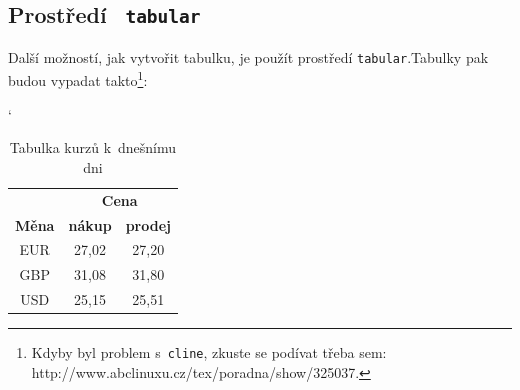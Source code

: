 \documentclass[11pt,a4paper]{article}
\begin{document}

\subsection{Prostředí \texttt{ tabular}}

Další možností, jak vytvořit tabulku, je použít prostředí \texttt{tabular}.Tabulky pak budou vypadat takto\footnote{Kdyby byl problem s~\texttt{cline}, zkuste se podívat třeba sem: http://www.abclinuxu.cz/tex/poradna/show/325037.}:

\bigbreak

\begin{table}[ht]
	\catcode`
 		\begin{center}
  			\begin{tabular}{|c|c|c|} \hline
     			& \multicolumn{2}{c|}{\textbf{Cena}} \\ \cline{2-3}
   			 	\textbf{Měna} & \textbf{nákup} & \textbf{prodej} \\ \hline 
    			EUR & 27,02 & 27,20 \\
    			GBP & 31,08 & 31,80 \\
    			USD & 25,15 & 25,51 \\ \hline
  			\end{tabular}
  			\caption{Tabulka kurzů k~dnešnímu dni}
			\label{tabulka_1} 		
 		\end{center}
\end{table}

\end{document}
